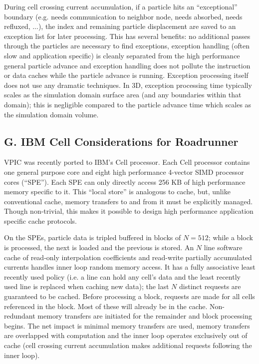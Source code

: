 \documentclass[letter,10pt]{article}
\begin{document}
During cell crossing current accumulation, if a particle hits an
``exceptional'' boundary (e.g. needs communication to neighbor node,
needs absorbed, needs refluxed, ...), the index and remaining particle
displacement are saved to an exception list for later processing.
This has several benefits: no additional passes through the particles
are necessary to find exceptions, exception handling (often slow and
application specific) is cleanly separated from the high performance
general particle advance and exception handling does not pollute the
instruction or data caches while the particle advance is running.
Exception processing itself does not use any dramatic techniques.  In
3D, exception processing time typically scales as the simulation
domain surface area (and any boundaries within that domain); this is
negligible compared to the particle advance time which scales as the
simulation domain volume.

\subsection{G. IBM Cell Considerations for Roadrunner}

VPIC was recently ported to IBM's Cell processor.  Each Cell processor
contains one general purpose core and eight high performance 4-vector
SIMD processor cores (``SPE'').  Each SPE can only directly access 256
KB of high performance memory specific to it.  This ``local store'' is
analogous to cache, but, unlike conventional cache, memory transfers
to and from it must be explicitly managed.  Though non-trivial, this
makes it possible to design high performance application specific
cache protocols. \cite{Kahle_et_al_2005}

On the SPEs, particle data is tripled buffered in blocks of $N=512$;
while a block is processed, the next is loaded and the previous is
stored.  An $N$ line software cache of read-only interpolation
coefficients and read-write partially accumulated currents handles
inner loop random memory access.  It has a fully associative least
recently used policy (i.e. a line can hold any cell's data and the
least recently used line is replaced when caching new data); the last
$N$ distinct requests are guaranteed to be cached.  Before processing
a block, requests are made for all cells referenced in the block.
Most of these will already be in the cache.  Non-redundant memory
transfers are initiated for the remainder and block processing begins.
The net impact is minimal memory transfers are used, memory transfers
are overlapped with computation and the inner loop operates
exclusively out of cache (cell crossing current accumulation makes
additional requests following the inner loop).
\end{document}
